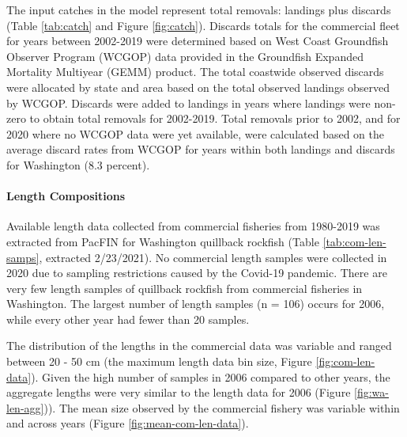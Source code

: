 \documentclass[11pt,
  english,
  a4paper,
]{article}
\begin{document}
\leavevmode\tagmcend\tagstructend\par


The input catches in the model represent total removals: landings plus discards (Table \ref{tab:catch} and Figure \ref{fig:catch}). Discards totals for the commercial fleet for years between 2002-2019 were determined based on West Coast Groundfish Observer Program (WCGOP) data provided in the Groundfish Expanded Mortality Multiyear (GEMM) product. The total coastwide observed discards were allocated by state and area based on the total observed landings observed by WCGOP. Discards were added to landings in years where landings were non-zero to obtain total removals for 2002-2019. Total removals prior to 2002, and for 2020 where no WCGOP data were yet available, were calculated based on the average discard rates from WCGOP for years within both landings and discards for Washington (8.3 percent).

\leavevmode\tagmcend\tagstructend\par


\hypertarget{length-compositions}{%
\paragraph{Length Compositions}\label{length-compositions}}

\leavevmode\tagmcend\tagstructend


Available length data collected from commercial fisheries from 1980-2019 was extracted from PacFIN for Washington quillback rockfish (Table \ref{tab:com-len-samps}, extracted 2/23/2021). No commercial length samples were collected in 2020 due to sampling restrictions caused by the Covid-19 pandemic. There are very few length samples of quillback rockfish from commercial fisheries in Washington. The largest number of length samples (n = 106) occurs for 2006, while every other year had fewer than 20 samples.

\leavevmode\tagmcend\tagstructend\par


The distribution of the lengths in the commercial data was variable and ranged between 20 - 50 cm (the maximum length data bin size, Figure \ref{fig:com-len-data}). Given the high number of samples in 2006 compared to other years, the aggregate lengths were very similar to the length data for 2006 (Figure \ref{fig:wa-len-agg})). The mean size observed by the commercial fishery was variable within and across years (Figure \ref{fig:mean-com-len-data}).
\end{document}
